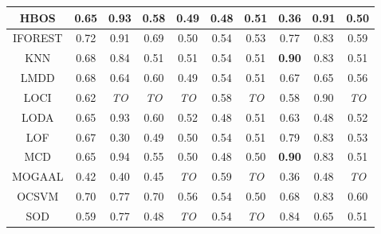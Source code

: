 \begin{table*}[!t]
\begin{center}
\begin{small}
\begin{tabular}{|c|c|c|c|c|c|c|c|c|c|}
\hline
                HBOS &                0.65 &             0.93 &            0.58 &           0.49 &           0.48 &          0.51 &                0.36 &            0.91 &           0.50 \\
\hline
        IFOREST &                0.72 &             0.91 &            0.69 &           0.50 &           0.54 &          0.53 &                0.77 &            0.83 &           0.59 \\
\hline
                KNN &                0.68 &             0.84 &            0.51 &           0.51 &           0.54 &          0.51 &       \textbf{0.90} &            0.83 &           0.51 \\
\hline
                LMDD &                0.68 &             0.64 &            0.60 &           0.49 &           0.54 &          0.51 &                0.67 &            0.65 &           0.56 \\
\hline
                LOCI &                0.62 &      \textit{TO} &     \textit{TO} &    \textit{TO} &           0.58 &   \textit{TO} &                0.58 &            0.90 &    \textit{TO} \\
\hline
                LODA &                0.65 &             0.93 &            0.60 &           0.52 &           0.48 &          0.51 &                0.63 &            0.48 &           0.52 \\
\hline
                LOF &                0.67 &             0.30 &            0.49 &           0.50 &           0.54 &          0.51 &                0.79 &            0.83 &           0.53 \\
\hline
                MCD &                0.65 &             0.94 &            0.55 &           0.50 &           0.48 &          0.50 &       \textbf{0.90} &            0.83 &           0.51 \\
\hline
        MOGAAL &                0.42 &             0.40 &            0.45 &    \textit{TO} &           0.59 &   \textit{TO} &                0.36 &            0.48 &    \textit{TO} \\
\hline
                OCSVM &                0.70 &             0.77 &            0.70 &           0.56 &           0.54 &          0.50 &                0.68 &            0.83 &           0.60 \\
\hline
                SOD &                0.59 &             0.77 &            0.48 &    \textit{TO} &           0.54 &   \textit{TO} &                0.84 &            0.65 &           0.51 \\
\hline

\end{tabular}
\end{small}
\end{center}
\end{table*}
